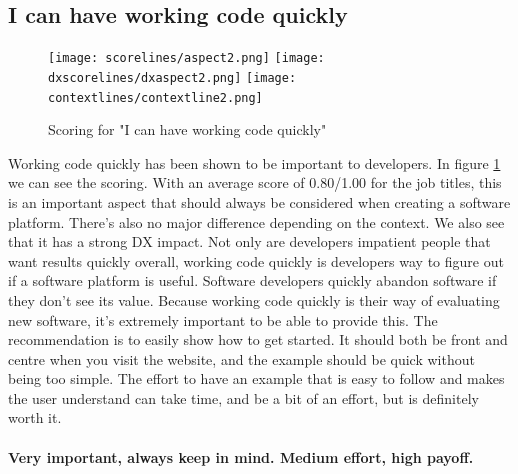 \documentclass{cslthse-msc}
\begin{document}
    \subsection{I can have working code quickly}
    \begin{figure}[H]
        \centering
        \texttt{[image: scorelines/aspect2.png]}
        \texttt{[image: dxscorelines/dxaspect2.png]}
        \texttt{[image: contextlines/contextline2.png]}
        \caption{Scoring for "I can have working code quickly"}
        \label{fig:aspect2}
    \end{figure}
    Working code quickly has been shown to be important to developers. In figure \ref{fig:aspect2} we can see the scoring. With an average score of 0.80/1.00 for the job titles, this is an important aspect that should always be considered when creating a software platform. There's also no major difference depending on the context. We also see that it has a strong DX impact. Not only are developers impatient people that want results quickly overall, working code quickly is developers way to figure out if a software platform is useful. Software developers quickly abandon software if they don't see its value. Because working code quickly is their way of evaluating new software, it's extremely important to be able to provide this. The recommendation is to easily show how to get started. It should both be front and centre when you visit the website, and the example should be quick without being too simple. The effort to have an example that is easy to follow  and makes the user understand can take time, and be a bit of an effort, but is definitely worth it.\\ \\
    \textbf{Very important, always keep in mind. Medium effort, high payoff.}
\end{document}
